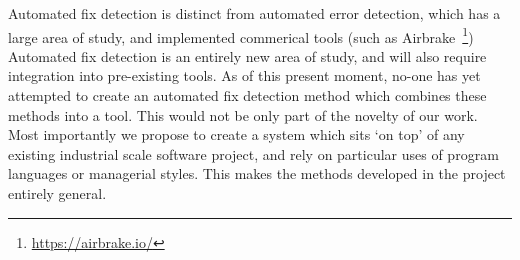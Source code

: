 Automated fix detection is distinct from automated error detection, which has a large area of study, and implemented commerical tools (such as Airbrake~\footnote{\url{https://airbrake.io/}}) Automated fix detection is an entirely new area of study, and will also require integration into pre-existing tools. As of this present moment, no-one has yet attempted to create
an automated fix detection method which combines these methods into a tool. This would not be
only part of the novelty of our work. Most importantly we propose to create a system which sits `on
top' of any existing industrial scale software project, and rely on particular uses of program languages or managerial styles. This makes the methods developed in the project entirely general. 


